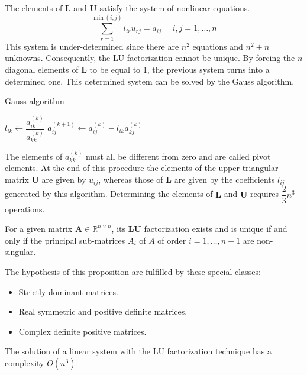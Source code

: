 \documentclass[12pt, a4paper]{report}
\newtheorem[style=M,bodystyle=\normalfont]{theorem}{Theorem}
\newtheorem[style=M,bodystyle=\normalfont]{proposition}{Proposition}
\newtheorem[style=M,bodystyle=\normalfont]{corollary}{Corollary}
\newtheorem[style=M,bodystyle=\normalfont]{lemma}{Lemma}
\newtheorem[style=M,bodystyle=\normalfont]{definition}{Definition}
\begin{document}
    The elements of $\boldsymbol{L}$ and $\boldsymbol{U}$ satisfy the system of nonlinear equations. 
    \[\sum_{r=1}^{\min{(i,j)}}{l_{ir}u_{rj}}=a_{ij} \:\:\:\:\:\: i,j=1,\dots,n\]
    This system is under-determined since there are $n^2$ equations and $n^2+n$ unknowns. Consequently, the LU factorization cannot be 
    unique. By forcing the $n$ diagonal elements of $\boldsymbol{L}$ to be equal to 1, the previous system turns into a determined 
    one. This determined system can be solved by the Gauss algorithm.
    \begin{algorithm}[H]
        \caption{Gauss algorithm}
            \begin{algorithmic}[1]
                        \State $l_{ik} \leftarrow \dfrac{a_{ik}^{(k)}}{a_{kk}^{(k)}}$
                            \State $a_{ij}^{(k+1)} \leftarrow a_{ij}^{(k)}-l_{ik}a_{kj}^{(k)}$
                        \EndFor
                    \EndFor
                \EndFor
            \end{algorithmic}
    \end{algorithm}
    The elements of $a_{kk}^{(k)}$ must all be different from zero and are called pivot elements. 
    At the end of this procedure the elements of the upper triangular matrix $\boldsymbol{U}$ are given by $u_{ij}$, whereas those of 
    $\boldsymbol{L}$ are given by the coefficients $l_{ij}$ generated by this algorithm. Determining the elements of $\boldsymbol{L}$ 
    and $\boldsymbol{U}$ requires $\dfrac{2}{3}n^3$ operations. 
    \begin{proposition}
        For a given matrix $\boldsymbol{A} \in \mathbb{R}^{n \times n}$, its $\boldsymbol{LU}$ factorization exists and is unique 
        if and only if the principal sub-matrices $A_i$ of $A$ of order $i=1,\dots,n-1$ are non-singular. 
    \end{proposition}
    The hypothesis of this proposition are fulfilled by these special classes: 
    \begin{itemize}
        \item Strictly dominant matrices. 
        \item Real symmetric and positive definite matrices. 
        \item Complex definite positive matrices. 
    \end{itemize}
    The solution of a linear system with the LU factorization technique has a complexity $O(n^3)$. 
\end{document}
